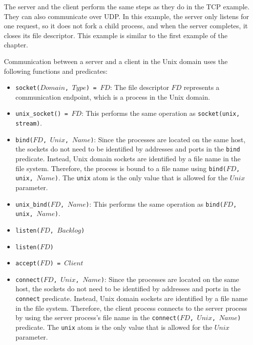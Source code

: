 The server and the client perform the same steps as they do in the TCP example.  They can also communicate over UDP.   In this example, the server only listens for one request, so it does not fork a child process, and when the server completes, it closes its file descriptor.  This example is similar to the first example of the chapter.  

Communication between a server and a client in the Unix domain uses the following functions and predicates: 

\begin{itemize}
\item \texttt{socket($Domain$, $Type$) = $FD$}: The file descriptor $FD$ represents a communication endpoint, which is a process in the Unix domain.
\item \texttt{unix\_socket() = $FD$}: This performs the same operation as \texttt{socket(unix, stream)}.
\item \texttt{bind($FD$, $Unix$, $Name$)}: Since the processes are located on the same host, the sockets do not need to be identified by addresses and ports in the \texttt{bind} predicate.  Instead, Unix domain sockets are identified by a file name in the file system.  Therefore, the process is bound to a file name using \texttt{bind($FD$, unix, $Name$)}.  The \texttt{unix} atom is the only value that is allowed for the $Unix$ parameter.
\item \texttt{unix\_bind($FD$, $Name$)}: This performs the same operation as \texttt{bind($FD$, unix, $Name$)}.
\item \texttt{listen($FD$, $Backlog$)}
\item \texttt{listen($FD$)}
\item \texttt{accept($FD$) = $Client$}
\item \texttt{connect($FD$, $Unix$, $Name$)}: Since the processes are located on the same host, the sockets do not need to be identified by addresses and ports in the \texttt{connect}  predicate.  Instead, Unix domain sockets are identified by a file name in the file system.  Therefore, the client process connects to the server process by using the server process's file name in the \texttt{connect($FD$, $Unix$, $Name$)} predicate. The \texttt{unix} atom is the only value that is allowed for the $Unix$ parameter.

\end{itemize}
